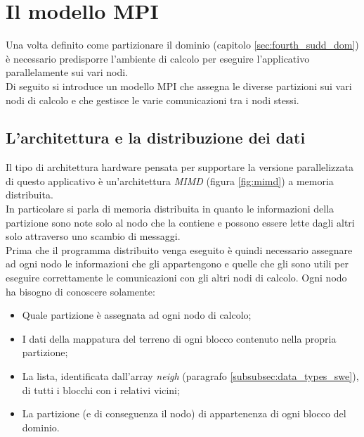 
\section{Il modello MPI}
Una volta definito come partizionare il dominio (capitolo \ref{sec:fourth_sudd_dom}) è necessario predisporre l'ambiente di calcolo per eseguire l'applicativo parallelamente sui vari nodi.\\
Di seguito si introduce un modello MPI che assegna le diverse partizioni sui vari nodi di calcolo e che gestisce le varie comunicazioni tra i nodi stessi.

\subsection{L'architettura e la distribuzione dei dati}
Il tipo di architettura hardware pensata per supportare la versione parallelizzata di questo applicativo è un'architettura \textit{MIMD} (figura \ref{fig:mimd}) a memoria distribuita.\\
In particolare si parla di memoria distribuita in quanto le informazioni della partizione sono note solo al nodo che la contiene e possono essere lette dagli altri solo attraverso uno scambio di messaggi.\\
Prima che il programma distribuito venga eseguito è quindi necessario assegnare ad ogni nodo le informazioni che gli appartengono e quelle che gli sono utili per eseguire correttamente le comunicazioni con gli altri nodi di calcolo.
Ogni nodo ha bisogno di conoscere solamente:
\begin{itemize}
	\item Quale partizione è assegnata ad ogni nodo di calcolo;
	\item I dati della mappatura del terreno di ogni blocco contenuto nella propria partizione;
	\item La lista, identificata dall'array \textit{neigh} (paragrafo \ref{subsubsec:data_types_swe}), di tutti i blocchi con i relativi vicini;
	\item La partizione (e di conseguenza il nodo) di appartenenza di ogni blocco del dominio.
\end{itemize}

